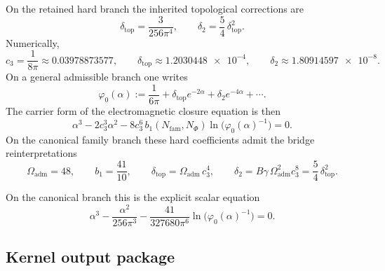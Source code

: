 \documentclass[11pt,a4paper]{article}
\theoremstyle{definition}
\theoremstyle{remark}
\newcommand{\cthree}{c_3}
\newcommand{\phiz}{\varphi_0}
\newcommand{\deltatop}{\delta_{\mathrm{top}}}
\newcommand{\bone}{b_1}
\newcommand{\Oadm}{\Omega_{\mathrm{adm}}}
\begin{document}
On the retained hard branch the inherited topological corrections are
\begin{equation}
\label{eq:hard-topological-kernel}
\deltatop=\frac{3}{256\pi^4},
\qquad
\delta_2=\frac54\,\deltatop^2.
\end{equation}
Numerically,
\[
\cthree=\frac{1}{8\pi}\approx \num{0.03978873577},
\qquad
\deltatop\approx \num{1.2030448e-4},
\qquad
\delta_2\approx \num{1.80914597e-8}.
\]
On a general admissible branch one writes
\begin{equation}
\label{eq:phi-opening}
\phiz(\alpha)
:=
\frac{1}{6\pi}
+ \deltatop e^{-2\alpha}
+ \delta_2 e^{-4\alpha}
+ \cdots.
\end{equation}
The carrier form of the electromagnetic closure equation is then
\label{eq:carrier-cfe}
\[
\alpha^3
-2\cthree^3\alpha^2
-8\cthree^6\,\bone(N_{\mathrm{fam}},N_\Phi)
\ln\!\bigl(\phiz(\alpha)^{-1}\bigr)\tag{\theequation}
=0.
\]
On the canonical family branch these hard coefficients admit the bridge reinterpretations
\[
\Oadm=48,
\qquad
\bone=\frac{41}{10},
\qquad
\deltatop=\Oadm\,\cthree^4,
\qquad
\delta_2=B\gamma\,\Oadm^2\cthree^8=\frac54\,\deltatop^2.
\]

On the canonical branch this is the explicit scalar equation
\[
\alpha^3-\frac{\alpha^2}{256\pi^3}-\frac{41}{327680\pi^6}\ln\!\bigl(\phiz(\alpha)^{-1}\bigr)=0.
\]

\subsection{Kernel output package}
\end{document}
